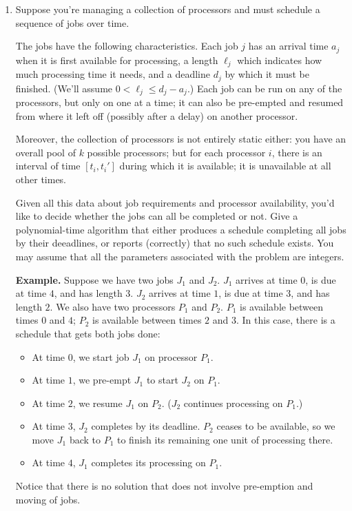 \documentclass[12pt]{article}
\begin{document}
\begin{enumerate}
\item 

Suppose you're managing a collection of processors
and must schedule a sequence of jobs over time.

The jobs have the following characteristics.
Each job $j$ has an arrival time $a_j$
when it is first available for processing,
a length $\ell_j$ which indicates how much processing
time it needs,
and a deadline $d_j$ by which it must be finished.
(We'll assume $0 < \ell_j \leq d_j - a_j$.)
Each job can be run on any of the processors,
but only on one at a time; it can also be
pre-empted and resumed from where it left off
(possibly after a delay) on another processor.

Moreover, the collection of processors is not
entirely static either:
you have an overall pool of $k$ possible processors;
but for each processor $i$, there is an interval of time
$[t_i,t_i']$ during which it is available;
it is unavailable at all other times.

Given all this data about job requirements and processor
availability, you'd like to decide whether
the jobs can all be completed or not.
Give a polynomial-time algorithm that either
produces a schedule completing all jobs by
their deeadlines, or reports (correctly)
that no such schedule exists.
You may assume that all the parameters associated
with the problem are integers.

{\bf Example.}
Suppose we have two jobs $J_1$ and $J_2$.
$J_1$ arrives at time $0$, is due at time $4$,
and has length $3$.
$J_2$ arrives at time $1$, is due at time $3$,
and has length $2$.
We also have two processors $P_1$ and $P_2$.
$P_1$ is available between times $0$ and $4$;
$P_2$ is available between times $2$ and $3$.
In this case, there is a schedule that gets both jobs done:
\begin{itemize}
\item At time $0$, we start job $J_1$ on processor $P_1$.
\item At time $1$, we pre-empt $J_1$ to start $J_2$ on $P_1$.
\item At time $2$, we resume $J_1$ on $P_2$.
($J_2$ continues processing on $P_1$.)
\item At time $3$, $J_2$ completes by its deadline.
$P_2$ ceases to be available, so we move $J_1$ back to
$P_1$ to finish its remaining one unit of processing there.
\item At time $4$, $J_1$ completes its processing on $P_1$.
\end{itemize}
Notice that there is no solution that does not involve
pre-emption and moving of jobs.


\end{enumerate}
\end{document}

